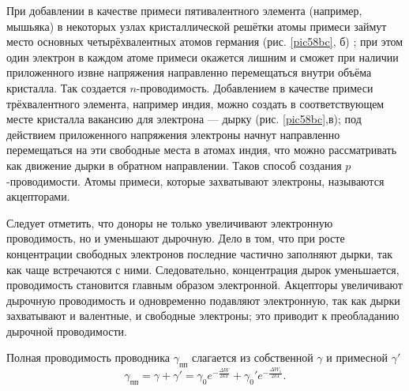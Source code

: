 \documentclass[a4paper,10pt]{book}
\begin{document}
При добавлении в качестве примеси пятивалентного элемента (например, мышьяка) в некоторых узлах кристаллической решётки атомы примеси займут место основных четырёхвалентных атомов германия (рис. \ref{pic58bc}, $\textit{б}$) ; при этом один электрон в каждом атоме примеси окажется лишним и сможет при наличии приложенного извне напряжения направленно перемещаться внутри объёма кристалла. Так создается $n$-проводимость. Добавлением в качестве примеси трёхвалентного элемента, например индия, можно создать в соответствующем месте кристалла вакансию для электрона — дырку (рис. \ref{pic58bc},$\textit{в}$); под действием приложенного напряжения электроны начнут направленно перемещаться на эти свободные места в атомах индия, что можно рассматривать как движение дырки в обратном направлении. Таков способ создания $p$-проводимости. Атомы примеси, которые захватывают электроны, называются акцепторами.

Следует отметить, что доноры не только увеличивают электронную проводимость, но и уменьшают дырочную. Дело в том, что при росте концентрации свободных электронов последние частично заполняют дырки, так как чаще встречаются с ними. Следовательно, концентрация дырок уменьшается, проводимость становится главным образом электронной. Акцепторы увеличивают дырочную проводимость и одновременно подавляют электронную, так как дырки захватывают и валентные, и свободные электроны; это приводит к преобладанию дырочной проводимости.

Полная проводимость проводника $\gamma_{\text{пп}}$ слагается из собственной $\gamma$ и примесной $\gamma'$\begin{equation}\label{26.5}
\gamma_{\text{пп}} = \gamma + \gamma' = \gamma_0 e^{-\frac{\Delta W}{2kT}} + \gamma_0' e^{-\frac{\Delta W_1}{2kT}}.
\end{equation}

\begin{figure}[h]
	\caption{}
	\label{pic59}
\end{figure}
\end{document}
